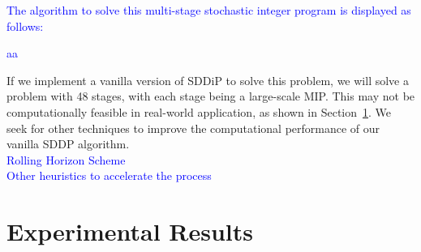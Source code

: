\documentclass[12pt]{article}
\begin{document}
	\textcolor{blue}{The algorithm to solve this multi-stage stochastic integer program is displayed as follows:\\
	\begin{algorithm}[H]
		aa
	\end{algorithm}}
	\noindent If we implement a vanilla version of SDDiP to solve this problem, we will solve a problem with 48 stages, with each stage being a large-scale MIP. This may not be computationally feasible in real-world application, as shown in Section~\ref{expResults}. We seek for other techniques to improve the computational performance of our vanilla SDDP algorithm.\\
	\newline
	\textcolor{blue}{Rolling Horizon Scheme}\\
	\textcolor{blue}{Other heuristics to accelerate the process}
\section{Experimental Results}\label{expResults}

\nocite{*}


\end{document}
